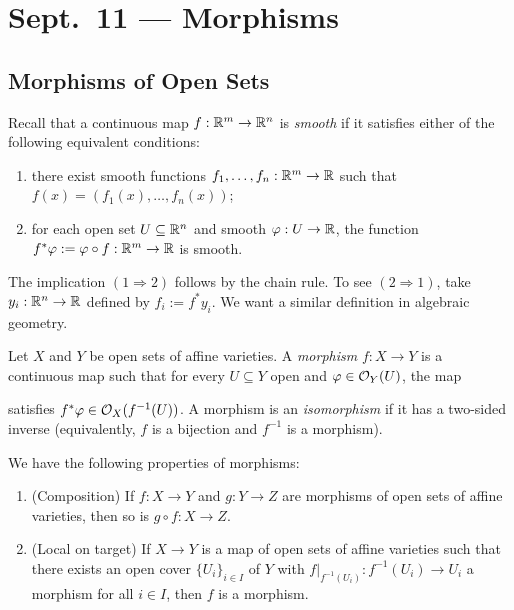 \chapter{Sept.~11 --- Morphisms}

\section{Morphisms of Open Sets}

\begin{remark}
  Recall that a continuous
  map $f : \mathbb{R}^m \to \mathbb{R}^n$ is \emph{smooth} if
  it satisfies either of the following equivalent conditions:
  \begin{enumerate}
    \item there exist smooth functions
      $f_1, \dots, f_n : \mathbb{R}^m \to \mathbb{R}$ such
      that $f(x) = (f_1(x), \dots, f_n(x))$;
    \item for each
      open set $U \subseteq \mathbb{R}^n$ and
      smooth $\varphi : U \to \mathbb{R}$,
      the function $f^* \varphi := \varphi \circ f : \mathbb{R}^m \to \mathbb{R}$
      is smooth.
  \end{enumerate}
  The implication $(1 \Rightarrow 2)$ follows
  by the chain rule. To see $(2 \Rightarrow 1)$,
  take $y_i : \mathbb{R}^n \to \mathbb{R}$
  defined by $f_i := f^* y_i$.
  We want a similar definition
  in algebraic geometry.
\end{remark}

\begin{definition}
  Let $X$ and $Y$ be open sets of affine
  varieties. A \emph{morphism}
  $f : X \to Y$ is a continuous map
  such that for every $U \subseteq Y$ open
  and $\varphi \in \mathcal{O}_Y(U)$, the map
  \begin{center}
  \end{center}
  satisfies $f^* \varphi \in \mathcal{O}_X(f^{-1}(U))$.
  A morphism is an \emph{isomorphism}
  if it has a two-sided inverse (equivalently,
  $f$ is a bijection and $f^{-1}$
  is a morphism).
\end{definition}

\begin{remark}
  We have the following properties of
  morphisms:
  \begin{enumerate}
    \item (Composition) If $f : X \to Y$
      and $g : Y \to Z$ are morphisms of
      open sets of affine varieties, then
      so is $g \circ f : X \to Z$.
    \item (Local on target) If $X \to Y$
      is a map of open sets of affine
      varieties such that there exists an
      open cover $\{U_i\}_{i \in I}$ of
      $Y$ with $f|_{f^{-1}(U_i)} : f^{-1}(U_i) \to U_i$
      a morphism for all $i \in I$, then
      $f$ is a morphism.
  \end{enumerate}
\end{remark}

